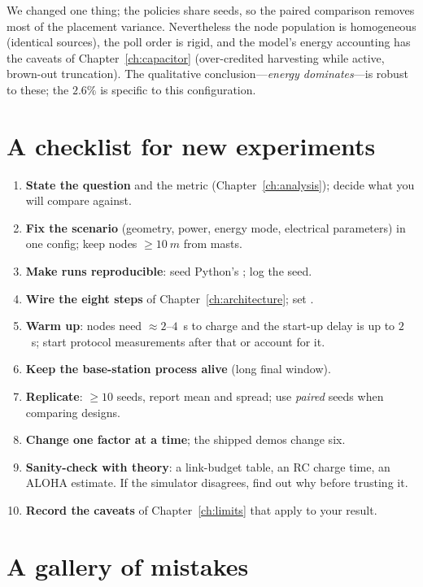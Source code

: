 \begin{reality}
We changed one thing; the policies share seeds, so the paired comparison removes most of the placement variance. Nevertheless the node population is homogeneous (identical sources), the poll order is rigid, and the model's energy accounting has the caveats of Chapter~\ref{ch:capacitor} (over-credited harvesting while active, brown-out truncation). The qualitative conclusion---\emph{energy dominates}---is robust to these; the $2.6\%$ is specific to this configuration.
\end{reality}

\section{A checklist for new experiments}
\label{sec:checklist}

\begin{enumerate}
 \item \textbf{State the question} and the metric (Chapter~\ref{ch:analysis}); decide what you will compare against.
 \item \textbf{Fix the scenario} (geometry, power, energy mode, electrical parameters) in one config; keep nodes $\ge\SI{10}{m}$ from masts.
 \item \textbf{Make runs reproducible}: seed Python's ; log the seed.
 \item \textbf{Wire the eight steps} of Chapter~\ref{ch:architecture}; set .
 \item \textbf{Warm up}: nodes need $\approx2$--$4$~s to charge and the start-up delay is up to $2$~s; start protocol measurements after that or account for it.
 \item \textbf{Keep the base-station process alive} (long final window).
 \item \textbf{Replicate}: $\ge10$ seeds, report mean and spread; use \emph{paired} seeds when comparing designs.
 \item \textbf{Change one factor at a time}; the shipped demos change six.
 \item \textbf{Sanity-check with theory}: a link-budget table, an RC charge time, an ALOHA estimate. If the simulator disagrees, find out why before trusting it.
 \item \textbf{Record the caveats} of Chapter~\ref{ch:limits} that apply to your result.
\end{enumerate}

\section{A gallery of mistakes}
\label{sec:mistakes}


